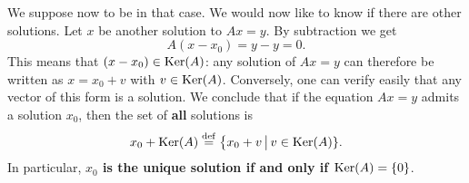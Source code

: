 \documentclass[11pt,nocut]{article}
\begin{document}
We suppose now to be in that case. We would now like to know if there are other solutions. Let $x$ be another solution to $Ax = y$. By subtraction we get 
$$
A(x - x_0) = y - y = 0.
$$
This means that $(x - x_0) \in {{\rm Ker}}(A)$: any solution of $Ax = y$ can therefore be written as $x = x_0 + v$ with $v \in {{\rm Ker}}(A)$. Conversely, one can verify easily that any vector of this form is a solution. We conclude that if the equation $Ax = y$ admits a solution $x_0$, then the set of \textbf{all} solutions is
$$
x_0 + {{\rm Ker}}(A) \overset{\rm def}{=} \big\{ x_0 + v \, \big| \, v \in {{\rm Ker}}(A) \}.
$$
In particular, \textbf{$x_0$ is the unique solution if and only if ${{\rm Ker}}(A) = \{0\}$}.



	\vspace{1cm}
	\centerline{}

%
%
\end{document}
